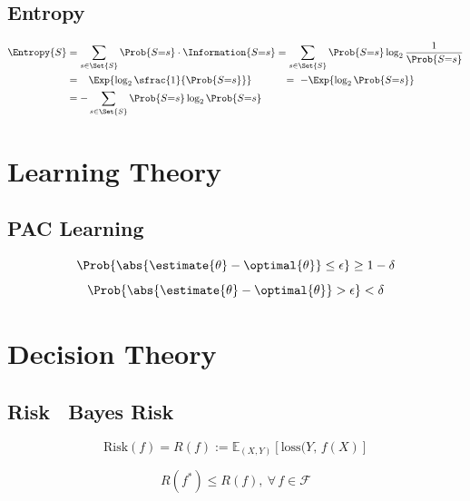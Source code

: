 \documentclass[18pt,a3paper,landscape, ncols=3]{cheatsheet}
\begin{document}
	\subsection{Entropy}
		\begin{mdframed}
			\begin{align*}
		    \Entropy{S} &= \sum_{s \in \Set{S}} \Prob{S{=}s} \cdot \Information{S{=}s} = \sum_{s \in \Set{S}} \Prob{S{=}s} \log_2 \frac{1}{\Prob{S{=}s}} \\
		                &=\quad\! \Exp{\log_2 \sfrac{1}{\Prob{S{=}s}}}\qquad\quad\, =\ {-} \Exp{\log_2 \Prob{S{=}s}} \\
		                &= {-} \sum_{s \in \Set{S}} \Prob{S{=}s} \log_2 \Prob{S{=}s}
		  \end{align*}
		\end{mdframed}

\section{Learning Theory} \seperator
	\subsection{PAC Learning}
		\begin{mdframed}
			\[
				\Prob{\abs{\estimate{\theta} - \optimal{\theta}} \leq \epsilon} \geq 1 - \delta 
			\]
			\[
				\Prob{\abs{\estimate{\theta} - \optimal{\theta}} > \epsilon} < \delta
			\]
		\end{mdframed}
		
\section{Decision Theory} \seperator
	\subsection{Risk \qquad\qquad\qquad\qquad\qquad\qquad\qquad\qquad\ Bayes Risk}
	\begin{mdframed}
		\begin{minipage}{0.5\textwidth}
			\[
				\mathrm{Risk}(f) = R(f) := \mathbb{E}_{(X,Y)}[\mathrm{loss}(Y,\, f(X)]
			\]
		\end{minipage}%
		\qquad\vrule%
		\begin{minipage}{0.5\textwidth}
			\[
				R(f^*) \leq R(f),\ \forall\, f \in \mathcal{F}
			\]
		\end{minipage}
	\end{mdframed}
\end{document}
